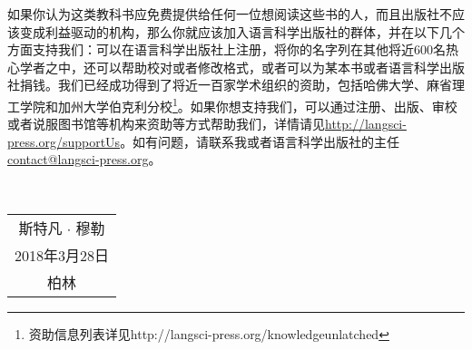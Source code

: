 
如果你认为这类教科书应免费提供给任何一位想阅读这些书的人，而且出版社不应该变成利益驱动的机构，那么你就应该加入语言科学出版社的群体，并在以下几个方面支持我们：可以在语言科学出版社上注册，将你的名字列在其他将近600名热心学者之中，还可以帮助校对或者修改格式，或者可以为某本书或者语言科学出版社捐钱。我们已经成功得到了将近一百家学术组织的资助，包括哈佛大学、麻省理工学院和加州大学伯克利分校\footnote{资助信息列表详见http://langsci-press.org/knowledgeunlatched
}。如果你想支持我们，可以通过注册、出版、审校或者说服图书馆等机构来资助等方式帮助我们，详情请见\url{http://langsci-press.org/supportUs}。如有问题，请联系我或者语言科学出版社的主任\href{mailto:contact@langsci-press.org}{contact@langsci-press.org}。


~\medskip

\begin{flushright}
\begin{tabular}{c}
斯特凡 $\cdot$ 穆勒\\
2018年3月28日\\
柏林\\
\end{tabular}
\end{flushright}

